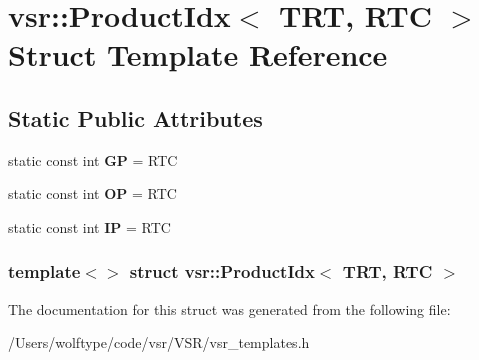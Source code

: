 \hypertarget{structvsr_1_1_product_idx_3_01_t_r_t_00_01_r_t_c_01_4}{\section{vsr\-:\-:Product\-Idx$<$ T\-R\-T, R\-T\-C $>$ Struct Template Reference}
\label{structvsr_1_1_product_idx_3_01_t_r_t_00_01_r_t_c_01_4}
}
\subsection*{Static Public Attributes}
\begin{DoxyCompactItemize}
\item 
\hypertarget{structvsr_1_1_product_idx_3_01_t_r_t_00_01_r_t_c_01_4_a31fdaff61e2572d7f0828d1a17a622db}{static const int {\bfseries G\-P} = R\-T\-C}\label{structvsr_1_1_product_idx_3_01_t_r_t_00_01_r_t_c_01_4_a31fdaff61e2572d7f0828d1a17a622db}

\item 
\hypertarget{structvsr_1_1_product_idx_3_01_t_r_t_00_01_r_t_c_01_4_afd77c7a980ef7e3707583f39d5de04f7}{static const int {\bfseries O\-P} = R\-T\-C}\label{structvsr_1_1_product_idx_3_01_t_r_t_00_01_r_t_c_01_4_afd77c7a980ef7e3707583f39d5de04f7}

\item 
\hypertarget{structvsr_1_1_product_idx_3_01_t_r_t_00_01_r_t_c_01_4_a0c8f76cafee2d680190d186dea16f95f}{static const int {\bfseries I\-P} = R\-T\-C}\label{structvsr_1_1_product_idx_3_01_t_r_t_00_01_r_t_c_01_4_a0c8f76cafee2d680190d186dea16f95f}

\end{DoxyCompactItemize}
\subsubsection*{template$<$$>$ struct vsr\-::\-Product\-Idx$<$ T\-R\-T, R\-T\-C $>$}



The documentation for this struct was generated from the following file\-:\begin{DoxyCompactItemize}
\item 
/\-Users/wolftype/code/vsr/\-V\-S\-R/vsr\-\_\-templates.\-h\end{DoxyCompactItemize}
